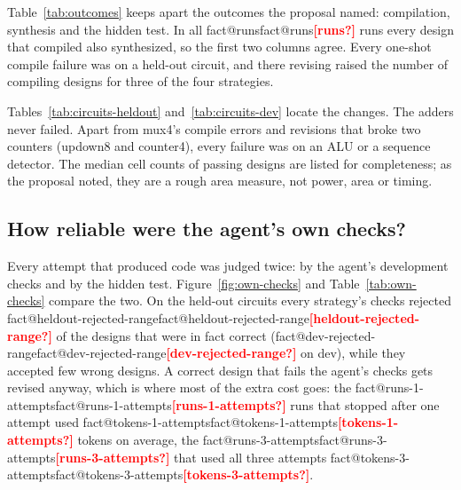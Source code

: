 \documentclass[11pt,a4paper]{article}
\makeatletter
\newcommand{\fact}[1]{\ifcsname fact@#1\endcsname\csname fact@#1\endcsname\else\textcolor{red}{\textbf{[#1?]}}\fi}
\makeatother
\begin{document}
Table~\ref{tab:outcomes} keeps apart the outcomes the proposal named: compilation, synthesis and the hidden test.
In all \fact{runs} runs every design that compiled also synthesized, so the first two columns agree. Every one-shot
compile failure was on a held-out circuit, and there revising raised the number of compiling designs for three of
the four strategies.

\begin{table}[H]
\centering\small

\caption{Compilation, synthesis and hidden-test outcomes, one-shot $\to$ final, out of 25 runs per strategy and
split, and the mean number of attempts per run.}
\label{tab:outcomes}
\end{table}

Tables~\ref{tab:circuits-heldout} and~\ref{tab:circuits-dev} locate the changes. The adders never failed. Apart
from mux4's compile errors and revisions that broke two counters (updown8 and counter4), every failure was on an
ALU or a sequence detector. The median cell counts of passing designs are listed for completeness; as the proposal
noted, they are a rough area measure, not power, area or timing.

\begin{table}[H]
\centering\small

\caption{Held-out circuits: passing runs out of 5, one-shot $\to$ iterative, and the median cell count of passing final
designs.}
\label{tab:circuits-heldout}
\end{table}

\begin{table}[H]
\centering\small

\caption{Dev circuits, as in Table~\ref{tab:circuits-heldout}.}
\label{tab:circuits-dev}
\end{table}

\subsection{How reliable were the agent's own checks?}\label{sec:own-checks}

Every attempt that produced code was judged twice: by the agent's development checks and by the hidden test.
Figure~\ref{fig:own-checks} and Table~\ref{tab:own-checks} compare the two. On the held-out circuits every strategy's
checks rejected \fact{heldout-rejected-range} of the designs that were in fact correct (\fact{dev-rejected-range} on
dev), while they accepted few wrong designs. A correct design that fails the agent's checks gets revised anyway,
which is where most of the extra cost goes: the \fact{runs-1-attempts} runs that stopped after one attempt used
\fact{tokens-1-attempts} tokens on average, the \fact{runs-3-attempts} that used all three attempts
\fact{tokens-3-attempts}.
\end{document}

